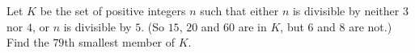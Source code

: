 Let $K$ be the set of positive integers $n$ such that either $n$ is divisible by neither $3$ nor $4$, or $n$ is divisible by $5$. (So $15$, $20$ and $60$ are in $K$, but $6$ and $8$ are not.) Find the $79$th smallest member of $K$.
